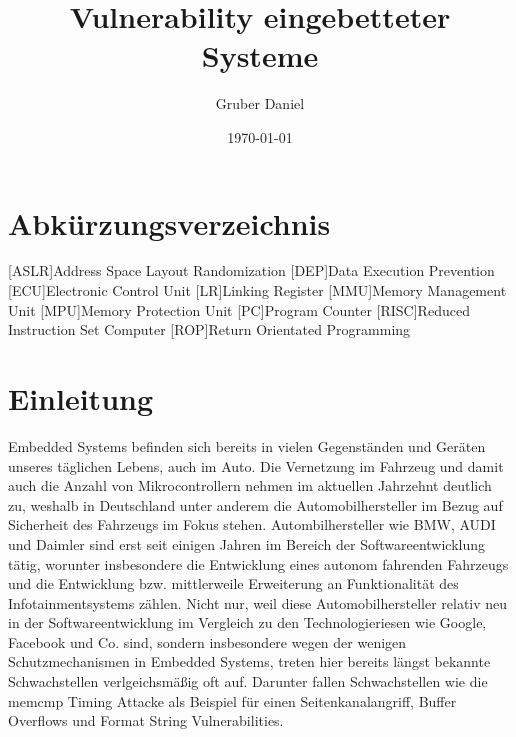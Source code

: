 \documentclass[a4paper,
DIV=13,
12pt,
BCOR=10mm,
department=FakIM,
oneside,
parskip=half,
automark,
listof=totocnumbered,
bibliography=totocnumbered,
acronym=totocnumbered
] {OTHRartcl}
\date{\today}
\title{Vulnerability eingebetteter Systeme}
\author{Gruber Daniel}
\begin{document}
\maketitle

\tableofcontents
\newpage

\section*{Abkürzungsverzeichnis}
\label{abkuerzungsverzeichnis}
\begin{acronym}[AUTOSAR]
  [ASLR]{Address Space Layout Randomization}
  [DEP]{Data Execution Prevention}
  [ECU]{Electronic Control Unit}
  [LR]{Linking Register}
  [MMU]{Memory Management Unit}
  [MPU]{Memory Protection Unit}
  [PC]{Program Counter}
  [RISC]{Reduced Instruction Set Computer}
  [ROP]{Return Orientated Programming}
\end{acronym}
\newpage

\section{Einleitung}
\label{sec:Einleitung}
Embedded Systems befinden sich bereits in vielen Gegenständen und Geräten unseres täglichen Lebens, auch im Auto.
Die Vernetzung im Fahrzeug und damit auch die Anzahl von Mikrocontrollern nehmen im aktuellen Jahrzehnt deutlich zu, weshalb in Deutschland unter anderem die Automobilhersteller im Bezug auf Sicherheit des Fahrzeugs im Fokus stehen.
Autombilhersteller wie BMW, AUDI und Daimler sind erst seit einigen Jahren im Bereich der Softwareentwicklung tätig, worunter insbesondere die Entwicklung eines autonom fahrenden Fahrzeugs und die Entwicklung
bzw. mittlerweile Erweiterung an Funktionalität des Infotainmentsystems zählen. Nicht nur, weil diese Automobilhersteller relativ neu in der Softwareentwicklung im Vergleich zu den Technologieriesen wie Google, Facebook und Co.
sind, sondern insbesondere wegen der wenigen Schutzmechanismen in Embedded Systems, treten hier bereits längst bekannte Schwachstellen verlgeichsmäßig oft auf.
Darunter fallen Schwachstellen wie die memcmp Timing Attacke als Beispiel für einen Seitenkanalangriff, Buffer Overflows und Format String Vulnerabilities.
\end{document}
